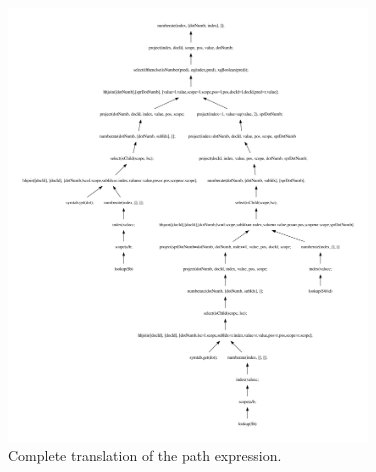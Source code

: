 \begin{figure}[!htp]
\begin{center}
  \includegraphics[width=0.85\textwidth]{img/graphs/TD_patExprPred}
  \caption{Complete translation of the path expression.}
  \label{fig:results:query_pathpred_result}
\end{center}
\end{figure}

